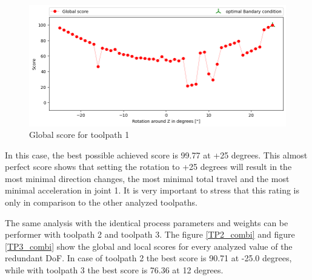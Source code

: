 \begin{figure}[H]
	\centerline{\includegraphics[width=1\textwidth]{figures/best_c_1.png}}
	\caption{Global score for toolpath 1}
	\label{GS1}
\end{figure}
In this case, the best possible achieved score is 99.77 at +25 degrees. This almost perfect score shows that setting the rotation to +25 degrees will result in the most minimal direction changes, the most minimal total travel and the most minimal acceleration in joint 1. It is very important to stress that this rating is only in comparison to the other analyzed toolpaths.

The same analysis with the identical process parameters and weights can be performer with toolpath 2 and toolpath 3. The figure \ref{TP2_combi} and figure \ref{TP3_combi} show the global and local scores for every analyzed value of the redundant DoF. In case of toolpath 2 the best score is 90.71 at -25.0 degrees, while with toolpath 3 the best score is 76.36 at 12 degrees.




